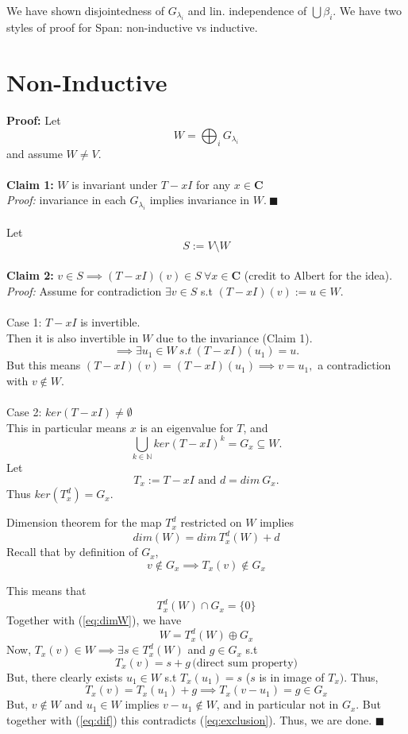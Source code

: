 \documentclass{article}
\begin{document}
We have shown disjointedness of $G_{\lambda_i}$ and lin. independence of $\bigcup \beta_i$. We have two styles of proof for Span: non-inductive vs inductive.

\section{Non-Inductive}
\textbf{Proof:} Let $$W=\bigoplus_i G_{\lambda_i}$$and assume $W\neq V$.\\ \\
\textbf{Claim 1:} $W$ is invariant under $T-xI$ for any $x\in\mathbf{C}$\\
\textit{Proof:} invariance in each $G_{\lambda_i}$ implies invariance in $W.\ \blacksquare$  \\ \\
Let $$S:=V\setminus W$$\\
\textbf{Claim 2:} $v\in S \implies (T-xI)(v)\in S \ \forall x\in \mathbf{C}$ (credit to Albert for the idea).\\
\textit{Proof:} Assume for contradiction $\exists v\in S$ s.t $(T-xI)
(v):=u\in W$.\\ \\
Case 1: $T-xI$ is invertible.\\
Then it is also invertible in $W$ due to the invariance (Claim 1). $$\implies \exists u_1 \in W \ s.t\ (T-xI)(u_1)=u.$$But this means $(T-xI)(v)=(T-xI)(u_1)\implies v=u_1,$ a contradiction with $v \notin W$.\\ \\
Case 2: $ker (T-xI)\neq \emptyset$\\
This in particular means $x$ is an eigenvalue for $T$, and $$\bigcup_{k\in \mathbb{N}} ker(T-xI)^k=G_x\subseteq W.$$
Let $$T_x:=T-xI \text{ and } d=dim\ G_x.$$Thus $ker(T_x^d)=G_x$.

Dimension theorem for the map $T_x^d$ restricted on $W$ implies \begin{equation}
    \label{eq:dimW}
    dim(W)=dim\ T_x^d(W) +d
\end{equation}
Recall that by definition of $G_x$, 
\begin{equation}
    \label{eq:exclusion}
    v\notin G_x \implies T_x(v)\notin G_x
\end{equation}

This means that $$T_x^d(W)\cap G_x=\{0\}$$
Together with (\ref{eq:dimW}), we have
$$W=T_x^d(W) \oplus G_x$$
Now, $T_x(v)\in W \implies \exists s\in T_x^d(W)$ and $g\in G_x$ s.t
$$T_x(v)=s+g\,\textrm{(direct sum property)}$$
But, there clearly exists $u_1\in W$ s.t $T_x(u_1)=s$ ($s$ is in image of $T_x)$.
Thus, 
\begin{equation}
    \label{eq:dif}
    T_x(v)=T_x(u_1)+g\implies T_x(v-u_1)=g\in G_x
\end{equation}
But, $v\notin W$ and $u_1\in W$ implies $v-u_1\notin W$, and in particular not in $G_x$.
But together with (\ref{eq:dif}) this contradicts (\ref{eq:exclusion}).
Thus, we are done. $\blacksquare$
\end{document}
